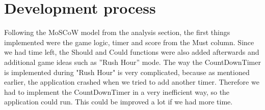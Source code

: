 \section{Development process}
Following the MoSCoW model from the analysis section, the first things implemented were the game logic, timer and score from the Must column. Since we had time left, the Should and Could functions were also added afterwards and additional game ideas such as ''Rush Hour'' mode.
The way the CountDownTimer is implemented during "Rush Hour" is very complicated, because as mentioned earlier, the application crashed when we tried to add another timer. Therefore we had to implement the CountDownTimer in a very inefficient way, so the application could run. This could be improved a lot if we had more time.